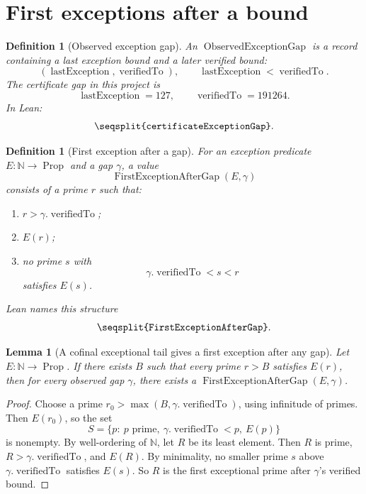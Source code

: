 \documentclass[11pt]{article}
\newtheorem{lemma}[theorem]{Lemma}
\newtheorem{definition}[theorem]{Definition}
\newcommand{\Nat}{\mathbb{N}}
\newcommand{\Lean}[1]{\texttt{\seqsplit{#1}}}
\begin{document}
\clearpage
\section{First exceptions after a bound}
\noindent

\begin{definition}[Observed exception gap]
An \(\operatorname{ObservedExceptionGap}\) is a record containing a last
exception bound and a later verified bound:
\[
  (\operatorname{lastException},\operatorname{verifiedTo}),
  \qquad
  \operatorname{lastException}<\operatorname{verifiedTo}.
\]
The certificate gap in this project is
\[
  \operatorname{lastException}=127,\qquad
  \operatorname{verifiedTo}=191264.
\]
In Lean:
\[
  \Lean{certificateExceptionGap}.
\]
\end{definition}

\begin{definition}[First exception after a gap]
For an exception predicate \(E:\Nat\to\operatorname{Prop}\) and a gap
\(\gamma\), a value
\[
  \operatorname{FirstExceptionAfterGap}(E,\gamma)
\]
consists of a prime \(r\) such that:
\begin{enumerate}[label=(\roman*)]
  \item \(r>\gamma.\operatorname{verifiedTo}\);
  \item \(E(r)\);
  \item no prime \(s\) with
  \[
    \gamma.\operatorname{verifiedTo}<s<r
  \]
  satisfies \(E(s)\).
\end{enumerate}
Lean names this structure
\[
  \Lean{FirstExceptionAfterGap}.
\]
\end{definition}

\begin{lemma}[A cofinal exceptional tail gives a first exception after any gap]
Let \(E:\Nat\to\operatorname{Prop}\).  If there exists \(B\) such that every
prime \(r>B\) satisfies \(E(r)\), then for every observed gap \(\gamma\), there
exists a \(\operatorname{FirstExceptionAfterGap}(E,\gamma)\).
\end{lemma}

\begin{proof}
Choose a prime \(r_0>\max(B,\gamma.\operatorname{verifiedTo})\), using
infinitude of primes.  Then \(E(r_0)\), so the set
\[
  S=\{p:\ p\text{ prime},\ \gamma.\operatorname{verifiedTo}<p,\ E(p)\}
\]
is nonempty.  By well-ordering of \(\Nat\), let \(R\) be its least element.
Then \(R\) is prime, \(R>\gamma.\operatorname{verifiedTo}\), and \(E(R)\).  By
minimality, no smaller prime \(s\) above \(\gamma.\operatorname{verifiedTo}\)
satisfies \(E(s)\).  So \(R\) is the first exceptional prime after
\(\gamma\)'s verified bound.
\end{proof}
\end{document}
